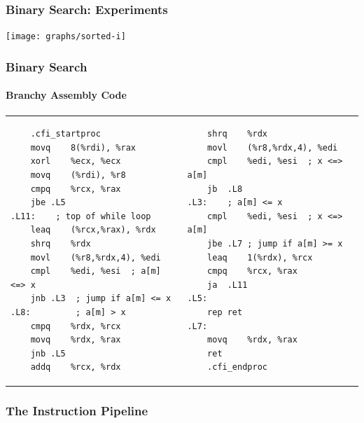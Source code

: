 \documentclass[xcolor=dvipsnames]{beamer}
\begin{document}
\begin{frame}
  \frametitle{Binary Search: Experiments}
  \begin{center}
    \texttt{[image: graphs/sorted-i]}
  \end{center}
\end{frame}

\begin{frame}[fragile]
  \frametitle{Binary Search}
  \framesubtitle{Branchy Assembly Code}

\vspace{-2em}
\footnotesize
\begin{tabular}{p{}p{}}
\begin{verbatim}
	.cfi_startproc
	movq	8(%rdi), %rax
	xorl	%ecx, %ecx
	movq	(%rdi), %r8
	cmpq	%rcx, %rax
	jbe	.L5
.L11:    ; top of while loop
	leaq	(%rcx,%rax), %rdx
	shrq	%rdx
	movl	(%r8,%rdx,4), %edi
	cmpl	%edi, %esi  ; a[m] <=> x
	jnb	.L3  ; jump if a[m] <= x
.L8:         ; a[m] > x
	cmpq	%rdx, %rcx
	movq	%rdx, %rax
	jnb	.L5
	addq	%rcx, %rdx
\end{verbatim} 
&
\begin{verbatim}
	shrq	%rdx
	movl	(%r8,%rdx,4), %edi
	cmpl	%edi, %esi  ; x <=> a[m]
	jb	.L8
.L3:    ; a[m] <= x
	cmpl	%edi, %esi  ; x <=> a[m]
	jbe	.L7 ; jump if a[m] >= x
	leaq	1(%rdx), %rcx
	cmpq	%rcx, %rax
	ja	.L11
.L5:
	rep ret
.L7:
	movq	%rdx, %rax
	ret
	.cfi_endproc
\end{verbatim}
\end{tabular}

\end{frame}

\begin{frame}
   \frametitle{The Instruction Pipeline}

   \begin{center}
   \end{center}
\end{frame}
\end{document}
